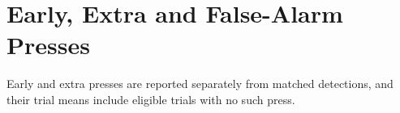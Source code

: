 \documentclass[
english,                 %
bibtex,                  %
includeExtraAbstracts, %
]{kththesis}
\newenvironment{evidenceblock}{\par\addvspace{6pt}\noindent\begin{minipage}{\linewidth}}{\end{minipage}\par\addvspace{6pt}}
\numberwithin{listing}{chapter}
\begin{document}
\section{Early, Extra and False-Alarm Presses}
\label{app:rq1-press-patterns}

\begin{evidenceblock}
\normalsize
Early and extra presses are reported separately from matched detections, and their trial means include eligible trials with no such press.

\begin{table}[H]
\centering
\scriptsize
\caption[Early and extra trigger presses]{Early and extra trigger presses in animated trials. Extra presses are unmatched to scheduled changes. \textit{M} and \textit{SD} are presses per eligible trial, including trials with no press.}
\label{tab:rq1-response-patterns}
\setlength{\tabcolsep}{2pt}
\renewcommand{\arraystretch}{1.15}
\end{table}
\end{evidenceblock}
\end{document}

